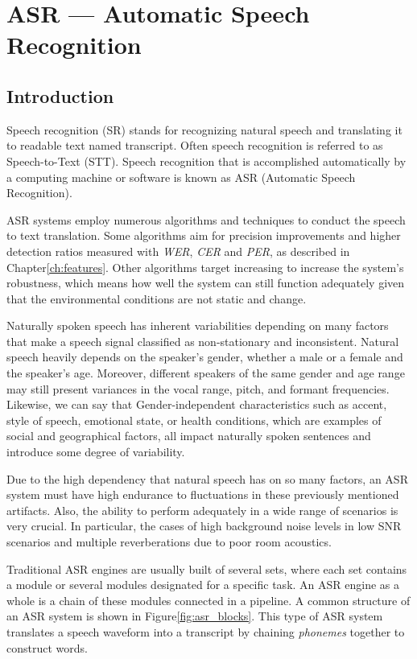 \chapter{ASR --- Automatic Speech Recognition}\label{ch:asr_ch}
\section{Introduction}
Speech recognition (SR) stands for recognizing 
natural speech and translating 
it to readable text named transcript.
Often speech recognition is referred to as Speech-to-Text (STT). 
Speech recognition 
that is accomplished 
automatically by a computing machine or 
software is known as ASR (Automatic Speech Recognition).

ASR systems employ numerous algorithms 
and techniques to conduct the speech to text translation.
Some algorithms aim for precision improvements
and higher detection ratios measured with \emph{WER},
\emph{CER}
and \emph{PER},
as described in Chapter\;\ref{ch:features}.
Other algorithms target increasing to increase
the system's robustness, which means
how well the system can still function adequately
given that the environmental conditions
are not static and change.

Naturally spoken speech has inherent 
variabilities depending on many 
factors that make a speech signal 
classified as non-stationary and inconsistent. 
Natural speech heavily depends on the speaker's gender, 
whether a male or a female and the speaker's age. 
Moreover, different speakers of the same 
gender and age range may still present variances 
in the vocal range, pitch, and formant frequencies.
Likewise, we can say that Gender-independent 
characteristics such as accent, style of speech, emotional state, 
or health conditions, 
which are examples of social and geographical factors, 
all impact naturally spoken sentences and 
introduce some degree of variability.

Due to the high dependency that natural speech has on so many factors, 
an ASR system must have high endurance to fluctuations in these 
previously mentioned artifacts. Also, the ability to perform adequately in a wide range of scenarios is very crucial.  
In particular, the cases of high background noise levels in low SNR scenarios and multiple reverberations due to poor room acoustics.

Traditional ASR engines 
are usually built of several sets, 
where each set contains a module or several 
modules designated for a specific task.
An ASR engine as a whole is a chain of these modules connected in a pipeline. 
A common structure of an ASR system
is shown in Figure\;\ref{fig:asr_blocks}. This type
of ASR system translates a speech waveform into a transcript
by chaining \emph{phonemes} together to construct words.

